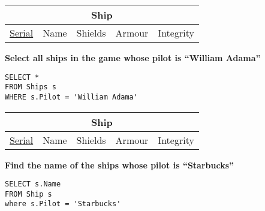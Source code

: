 \documentclass{beamer}
\begin{document}
\begin{frame}[fragile]
\begin{tabular}{|c|c|c|c|c|}
\hline
\multicolumn{5}{|c|}{\textbf{Ship}} \\
\hline
\underline{Serial} & Name & Shields & Armour & Integrity \\
\hline
\end{tabular}

\vspace{0.25cm}
\textbf{Select all ships in the game whose pilot is ``William Adama''}
\pause
\begin{lstlisting}
SELECT *
FROM Ships s
WHERE s.Pilot = 'William Adama'
\end{lstlisting}

\end{frame}

\begin{frame}[fragile]
\begin{tabular}{|c|c|c|c|c|}
\hline
\multicolumn{5}{|c|}{\textbf{Ship}} \\
\hline
\underline{Serial} & Name & Shields & Armour & Integrity \\
\hline
\end{tabular}

\vspace{0.25cm}
\textbf{Find the name of the ships whose pilot is ``Starbucks''}
\pause
\begin{lstlisting}
SELECT s.Name
FROM Ship s
where s.Pilot = 'Starbucks'
\end{lstlisting}

\end{frame}
\end{document}
